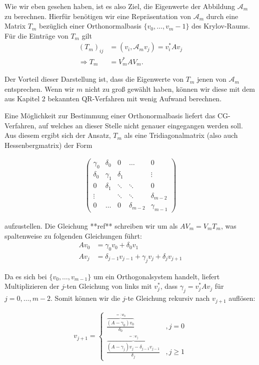 \documentclass{article}
\begin{document}
Wie wir eben gesehen haben, ist es also Ziel, die Eigenwerte der Abbildung $\mathcal{A}_m$ zu berechnen. Hierfür benötigen wir eine Repräsentation von $\mathcal{A}_m$ durch eine Matrix $T_m$ bezüglich einer Orthonormalbasis $\{v_0, \dots, v_m-1\}$ des Krylov-Raums. Für die Einträge von $T_m$ gilt
\begin{align*}
	(T_m)_{ij} &= (v_i, \mathcal{A}_m v_j) = v_i^*Av_j \\
	\Rightarrow T_m &= V_m^*AV_m.
\end{align*}

Der Vorteil dieser Darstellung ist, dass die Eigenwerte von $T_m$ jenen von $\mathcal{A}_m$ entsprechen. Wenn wir $m$ nicht zu groß gewählt haben, können wir diese mit dem aus Kapitel 2 bekannten QR-Verfahren mit wenig Aufwand berechnen.

Eine Möglichkeit zur Bestimmung einer Orthonormalbasis liefert das CG-Verfahren, auf welches an dieser Stelle nicht genauer eingegangen werden soll. Aus diesem ergibt sich der Ansatz, $T_m$ als eine Tridiagonalmatrix (also auch Hessenbergmatrix) der Form

\begin{align*}
\begin{pmatrix}
	\gamma_0 & \delta_0 & 0 & \hdots & 0 \\
	\delta_0 & \gamma_1 & \delta_1 &  & \vdots \\
	0 & \delta_1 & \ddots & \ddots & 0 \\
	\vdots &  & \ddots & \ddots & \delta_{m-2} \\
	0 & \hdots & 0 & \delta_{m-2} & \gamma_{m-1}
\end{pmatrix}
\end{align*}

aufzustellen. Die Gleichung **ref** schreiben wir um als $AV_m = V_m T_m$, was spaltenweise zu folgenden Gleichungen führt:
\begin{align*}
	A v_0 &= \gamma_0 v_0 + \delta_0 v_1 \\
	A v_j &= \delta_{j-1} v_{j-1} + \gamma_j v_j + \delta_j v_{j+1}
\end{align*}

Da es sich bei $\{v_0, \dots, v_{m-1}\}$ um ein Orthogonalsystem handelt, liefert Multiplizieren der $j$-ten Gleichung von links mit $v_j^*$, dass $\gamma_j = v_j^*Av_j$ für $j = 0, \dots, m-2$. Somit können wir die $j$-te Gleichung rekursiv nach $v_{j+1}$ auflösen:

\begin{align*}
	v_{j+1} = \begin{cases}
		\frac{\overbrace{(A-\gamma_0)v_0}^{=:w_0}}{\delta_0} &,j = 0 \\
		\frac{\overbrace{(A-\gamma_j)v_j - \delta_{j-1} v_{j-1}}^{=:w_j}}{\delta_j} &,j \geq 1
	\end{cases}
\end{align*}
\end{document}
